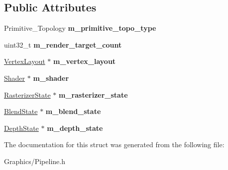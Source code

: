 \subsection*{Public Attributes}
\begin{DoxyCompactItemize}
\item 
\mbox{\label{structGraphicsPipelineDesc_a4676010a2183caff9077d8a41eb57463}} 
Primitive\+\_\+\+Topology {\bfseries m\+\_\+primitive\+\_\+topo\+\_\+type}
\item 
\mbox{\label{structGraphicsPipelineDesc_a70aea7f4da2cf253ca565d4f2dee66a7}} 
uint32\+\_\+t {\bfseries m\+\_\+render\+\_\+target\+\_\+count}
\item 
\mbox{\label{structGraphicsPipelineDesc_a226318f843faacf259ca271c4168a38a}} 
\hyperlink{structVertexLayout}{Vertex\+Layout} $\ast$ {\bfseries m\+\_\+vertex\+\_\+layout}
\item 
\mbox{\label{structGraphicsPipelineDesc_a8f49f47ea409edcfc1b058ddeeced227}} 
\hyperlink{classShader}{Shader} $\ast$ {\bfseries m\+\_\+shader}
\item 
\mbox{\label{structGraphicsPipelineDesc_a9a6599d40dae94dee727db2740f97d21}} 
\hyperlink{classRasterizerState}{Rasterizer\+State} $\ast$ {\bfseries m\+\_\+rasterizer\+\_\+state}
\item 
\mbox{\label{structGraphicsPipelineDesc_a1318032e936996b5cdeaa361e62e2484}} 
\hyperlink{classBlendState}{Blend\+State} $\ast$ {\bfseries m\+\_\+blend\+\_\+state}
\item 
\mbox{\label{structGraphicsPipelineDesc_a74057f047ede40785eacd0ec5693e326}} 
\hyperlink{classDepthState}{Depth\+State} $\ast$ {\bfseries m\+\_\+depth\+\_\+state}
\end{DoxyCompactItemize}


The documentation for this struct was generated from the following file\+:\begin{DoxyCompactItemize}
\item 
Graphics/Pipeline.\+h\end{DoxyCompactItemize}
